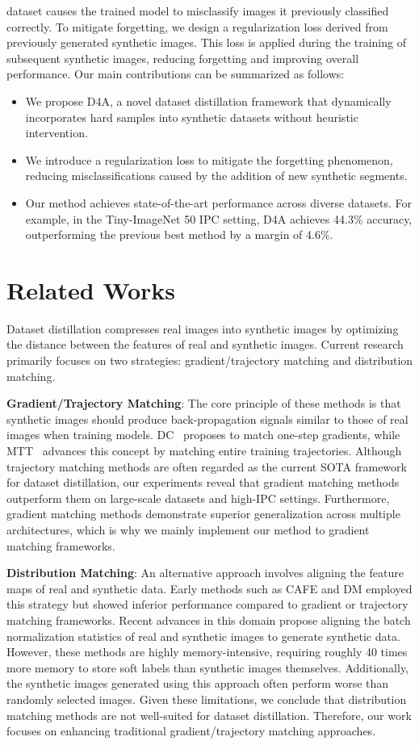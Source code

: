 \documentclass{article}
\theoremstyle{plain}
\theoremstyle{definition}
\theoremstyle{remark}
\begin{document}
dataset causes the trained model to misclassify images it previously classified correctly.
To mitigate forgetting, we design a regularization loss derived from previously generated
synthetic images. This loss is applied during the training of subsequent synthetic images,
reducing forgetting and improving overall performance.
Our main contributions can be summarized as follows:
\begin{itemize}
    \item We propose D4A, a novel dataset distillation framework that dynamically incorporates hard samples into synthetic datasets without heuristic intervention.  
    \item We introduce a regularization loss to mitigate the forgetting phenomenon, reducing misclassifications caused by the addition of new synthetic segments.  
    \item Our method achieves state-of-the-art performance across diverse datasets. For example, in the Tiny-ImageNet 50 IPC setting, D4A achieves 44.3\% accuracy, outperforming the previous best method by a margin of 4.6\%.  
\end{itemize}


\section{Related Works}
Dataset distillation compresses real images into synthetic images by optimizing the distance between the features of real and synthetic images.
Current research primarily focuses on two strategies: gradient/trajectory matching and distribution matching.

\textbf{Gradient/Trajectory Matching}: The core principle of these methods is that synthetic images should produce back-propagation signals similar to those of real images when training models.
DC~\cite{} proposes to match one-step gradients, while MTT~\cite{} advances this concept by matching entire training trajectories.
Although trajectory matching methods are often regarded as the current SOTA framework for dataset distillation, our experiments reveal that gradient matching methods outperform them on large-scale datasets and high-IPC settings.
Furthermore, gradient matching methods demonstrate superior generalization across multiple architectures, which is why we mainly implement our method to gradient matching frameworks.

\textbf{Distribution Matching}: An alternative approach involves aligning the feature maps of real and synthetic data.
Early methods such as CAFE and DM employed this strategy but showed inferior performance compared to gradient or trajectory matching frameworks.
Recent advances in this domain propose aligning the batch normalization statistics of real and synthetic images to generate synthetic data.
However, these methods are highly memory-intensive, requiring roughly 40 times more memory to store soft labels than synthetic images themselves.
Additionally, the synthetic images generated using this approach often perform worse than randomly selected images.
Given these limitations, we conclude that distribution matching methods are not well-suited for dataset distillation. Therefore, our work focuses on enhancing traditional gradient/trajectory matching approaches.
\end{document}

